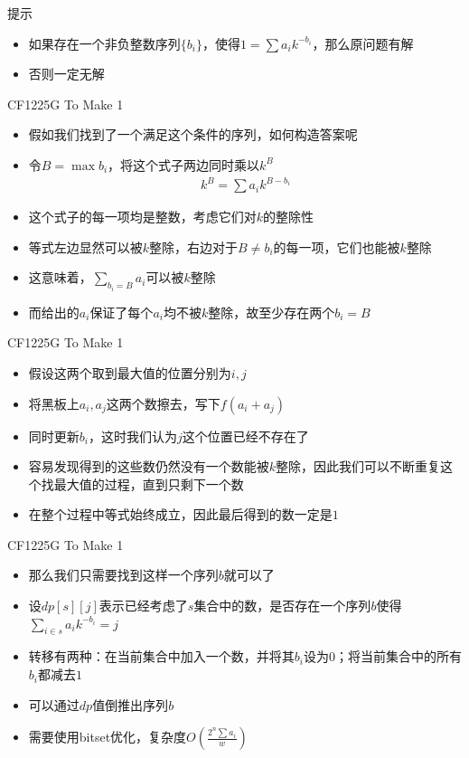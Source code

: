 \documentclass{beamer}
\begin{document}
\begin{frame}{提示}
    \begin{itemize}
        \item 如果存在一个非负整数序列$\{b_i\}$，使得$1=\sum a_i k^{-b_i}$，那么原问题有解
        \item 否则一定无解
    \end{itemize}
\end{frame}

\begin{frame}{CF1225G To Make 1}
    \begin{itemize}
        \item 假如我们找到了一个满足这个条件的序列，如何构造答案呢
        \item 令$B=\max b_i$，将这个式子两边同时乘以$k^B$
        $$\begin{aligned}
            k^B = \sum a_i k^{B - b_i}
        \end{aligned}$$
        \item 这个式子的每一项均是整数，考虑它们对$k$的整除性
        \item 等式左边显然可以被$k$整除，右边对于$B\neq b_i$的每一项，它们也能被$k$整除
        \item 这意味着，$\sum\limits_{b_i = B} a_i$可以被$k$整除
        \item 而给出的$a_i$保证了每个$a_i$均不被$k$整除，故至少存在两个$b_i = B$
    \end{itemize}
\end{frame}

\begin{frame}{CF1225G To Make 1}
    \begin{itemize}
        \item 假设这两个取到最大值的位置分别为$i,j$
        \item 将黑板上$a_i, a_j$这两个数擦去，写下$f(a_i + a_j)$
        \item 同时更新$b_i$，这时我们认为$j$这个位置已经不存在了
        \item 容易发现得到的这些数仍然没有一个数能被$k$整除，因此我们可以不断重复这个找最大值的过程，直到只剩下一个数
        \item 在整个过程中等式始终成立，因此最后得到的数一定是$1$
    \end{itemize}
\end{frame}

\begin{frame}{CF1225G To Make 1}
    \begin{itemize}
        \item 那么我们只需要找到这样一个序列$b$就可以了
        \item 设$dp[s][j]$表示已经考虑了$s$集合中的数，是否存在一个序列$b$使得$\sum\limits_{i \in s}a_ik^{-b_i} = j$
        \item 转移有两种：在当前集合中加入一个数，并将其$b_i$设为$0$；将当前集合中的所有$b_i$都减去$1$
        \item 可以通过$dp$值倒推出序列$b$
        \item 需要使用bitset优化，复杂度$O(\frac{2^n\sum a_i}{w})$
    \end{itemize}
\end{frame}
\end{document}
